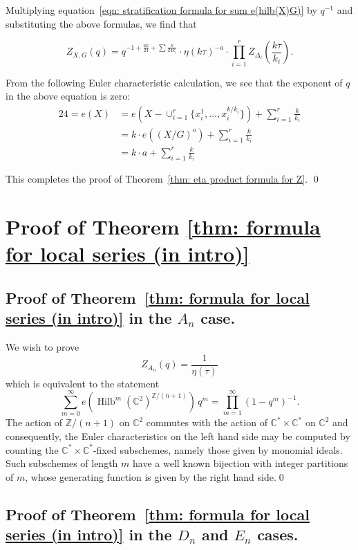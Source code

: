 \documentclass{amsart}
\theoremstyle{definition}
\newcommand{\CC} {{\mathbb C}}          %
\newcommand{\ZZ} {{\mathbb Z}}		%
\newcommand{\Hilb}{\operatorname{Hilb}}
\begin{document}
Multiplying equation~\eqref{eqn: stratification formula for sum
e(hilb(X)G)} by $q^{-1}$ and substituting the above formulas, we find
that

\[
Z_{X,G}(q) = q^{-1 +\frac{ak}{24} + \sum \frac{k}{24k_{i}} } \cdot 
\eta (k\tau )^{-a}\cdot 
\prod_{i=1}^{r}Z_{\Delta_{i}}\left(\frac{k\tau}{k_{i}} \right) .
\]

From the following Euler characteristic calculation, we see that the exponent of $q$ in the above equation is zero:
\begin{align*}
24 = e(X) &= e\left(X-\cup_{i=1}^{r} \{x_{i}^{1},\dotsc
,x_{i}^{k/k_{i}} \} \right) + \sum_{i=1}^{r} \frac{k}{k_{i}} \\
&= k \cdot e\left((X/G)^{o} \right) + \sum_{i=1}^{r} \frac{k}{k_{i}} \\
&= k\cdot a + \sum_{i=1}^{r}\frac{k}{k_{i}} 
\end{align*}

This completes the proof of Theorem~\ref{thm: eta product formula for
Z}.  \qed


\section{Proof of Theorem \ref{thm: formula for local series (in
intro)}}\label{sec: proof of formula for local series}

\subsection{Proof of Theorem~\ref{thm: formula for local series (in
intro)} in the $A_{n}$ case.}\label{subsec: proof of An case of
local series}

We wish to prove
\[
Z_{A_{n}}(q) = \frac{1}{\eta (\tau )}
\]
which is equivalent to the statement
\[
\sum_{m=0}^{\infty} e\left(\Hilb^{m} (\CC^{2})^{\ZZ /(n+1)} \right)
\,q^{m} = \prod_{m=1}^{\infty} (1-q^{m})^{-1}.
\]
The action of $\ZZ /(n+1)$ on $\CC^{2}$ commutes with the action of
$\CC^{*}\times \CC^{*}$ on $\CC^{2}$ and consequently, the Euler
characteristics on the left hand side may be computed by counting
the $\CC^{*}\times \CC^{*}$-fixed subschemes, namely those given by
monomial ideals. Such subschemes of length $m$ have a well known
bijection with integer partitions of $m$, whose generating function is
given by the right hand side.\qed 

\subsection{Proof of Theorem~\ref{thm: formula for local series (in
intro)} in the $D_{n}$ and $E_{n}$ cases.}\label{subsec: proof of Dn
and En cases of local series}
\end{document}
